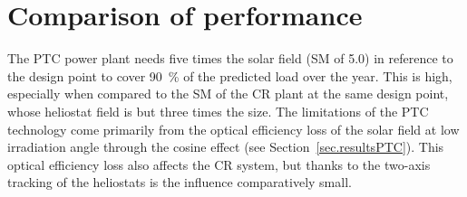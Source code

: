 \section{Comparison of performance}

%
%

The PTC power plant needs five times the solar field (SM of \num{5.0}) in reference to the design point to cover \SI{90}{\percent} of the predicted load over the year. This is high, especially when compared to the SM of the CR plant at the same design point, whose heliostat field is but three times the size. The limitations of the PTC technology come primarily from the optical efficiency loss of the solar field at low irradiation angle through the cosine effect (see Section~\ref{sec.resultsPTC}). This optical efficiency loss also affects the CR system, but thanks to the two-axis tracking of the heliostats is the influence comparatively small. 


